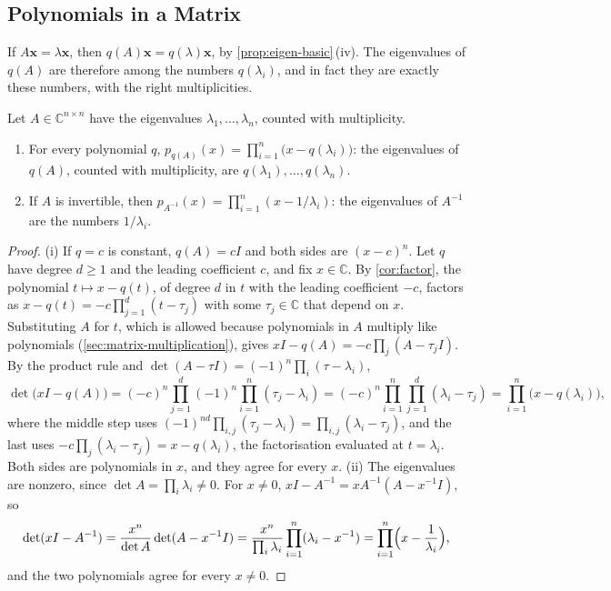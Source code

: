 \subsection{Polynomials in a Matrix}

If $A\mathbf x=\lambda\mathbf x$, then $q(A)\mathbf x=q(\lambda)\mathbf x$, by \cref{prop:eigen-basic}\,(iv). The eigenvalues of $q(A)$ are therefore among the numbers $q(\lambda_i)$, and in fact they are exactly these numbers, with the right multiplicities.

\begin{theorem}
\label{thm:spectral-mapping}
Let $A\in\mathbb C^{n\times n}$ have the eigenvalues $\lambda_1,\ldots,\lambda_n$, counted with multiplicity.
\begin{enumerate}
\item For every polynomial $q$, $p_{q(A)}(x)=\prod_{i=1}^n\bigl(x-q(\lambda_i)\bigr)$: the eigenvalues of $q(A)$, counted with multiplicity, are $q(\lambda_1),\ldots,q(\lambda_n)$.
\item If $A$ is invertible, then $p_{A^{-1}}(x)=\prod_{i=1}^n(x-1/\lambda_i)$: the eigenvalues of $A^{-1}$ are the numbers $1/\lambda_i$.
\end{enumerate}
\end{theorem}

\begin{proof}
(i) If $q=c$ is constant, $q(A)=cI$ and both sides are $(x-c)^n$. Let $q$ have degree $d\ge1$ and the leading coefficient $c$, and fix $x\in\mathbb C$. By \cref{cor:factor}, the polynomial $t\mapsto x-q(t)$, of degree $d$ in $t$ with the leading coefficient $-c$, factors as $x-q(t)=-c\prod_{j=1}^d(t-\tau_j)$ with some $\tau_j\in\mathbb C$ that depend on $x$. Substituting $A$ for $t$, which is allowed because polynomials in $A$ multiply like polynomials (\cref{sec:matrix-multiplication}), gives $xI-q(A)=-c\prod_j(A-\tau_jI)$. By the product rule and $\det(A-\tau I)=(-1)^n\prod_i(\tau-\lambda_i)$,
\[
\det\bigl(xI-q(A)\bigr)=(-c)^n\prod_{j=1}^d(-1)^n\prod_{i=1}^n(\tau_j-\lambda_i)=(-c)^n\prod_{i=1}^n\prod_{j=1}^d(\lambda_i-\tau_j)=\prod_{i=1}^n\bigl(x-q(\lambda_i)\bigr),
\]
where the middle step uses $(-1)^{nd}\prod_{i,j}(\tau_j-\lambda_i)=\prod_{i,j}(\lambda_i-\tau_j)$, and the last uses $-c\prod_j(\lambda_i-\tau_j)=x-q(\lambda_i)$, the factorisation evaluated at $t=\lambda_i$. Both sides are polynomials in $x$, and they agree for every $x$. (ii) The eigenvalues are nonzero, since $\det A=\prod_i\lambda_i\ne0$. For $x\ne0$, $xI-A^{-1}=xA^{-1}(A-x^{-1}I)$, so
\[
\det(xI-A^{-1})=\frac{x^n}{\det A}\det(A-x^{-1}I)=\frac{x^n}{\prod_i\lambda_i}\prod_{i=1}^n(\lambda_i-x^{-1})=\prod_{i=1}^n\Bigl(x-\frac1{\lambda_i}\Bigr),
\]
and the two polynomials agree for every $x\ne0$.
\end{proof}

